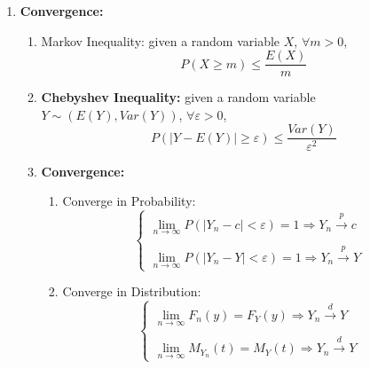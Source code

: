 \documentclass[a4paper,12pt]{article} %
\begin{document}
\begin{enumerate}
\item {{\bf Convergence:} 
\begin{enumerate}
    \item {Markov Inequality: given a random variable $X$, $\forall m >0$, $$P(X\geq m) \leq \frac{E(X)}{m}$$
    }
    \item {{\bf Chebyshev Inequality:} given a random variable $Y \sim (E(Y),Var(Y))$, $\forall \varepsilon >0$, $$P(|Y-E(Y)| \geq \varepsilon) \leq \frac{Var(Y)}{\varepsilon^2}$$
    }
    \item {{\bf Convergence:} 
    \begin{enumerate}
        \item {Converge in Probability: 
        \begin{equation}
        \left \{
        \begin{array}{lr} 
        \lim\limits_{n\rightarrow\infty} P(|Y_n-c|<\varepsilon)=1 \Rightarrow Y_n \xrightarrow{p} c & \\\\ \lim\limits_{n\rightarrow\infty} P(|Y_n-Y|<\varepsilon)=1 \Rightarrow Y_n \xrightarrow{p} Y & 
        \end{array}\right.
        \end{equation}}
        
        \item {Converge in Distribution: 
        \begin{equation}
        \left \{
        \begin{array}{lr} 
        \lim\limits_{n\rightarrow\infty}F_n(y)=F_Y(y) \Rightarrow Y_n \xrightarrow{d} Y & \\\\ \lim\limits_{n\rightarrow\infty}M_{Y_n}(t)=M_Y(t) \Rightarrow Y_n \xrightarrow{d} Y & 
        \end{array}\right.
        \end{equation}}
        

\end{enumerate}}
\end{enumerate}}
\end{enumerate}
\end{document}
